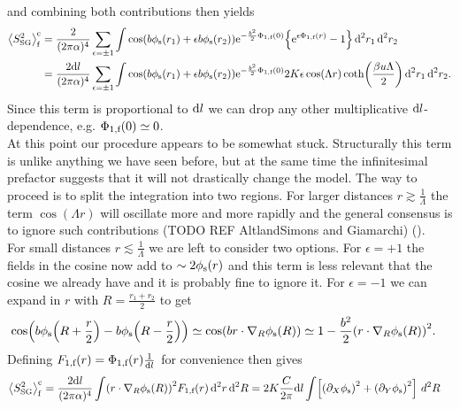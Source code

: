 \documentclass[english, parskip=full]{scrartcl}
\begin{document}
and combining both contributions then yields
\begin{align}
\bra*{S_\text{SG}^2}_\f^\c &= \frac{2}{(2\pi\alpha)^4} \sum_{\epsilon=\pm 1} \int \cos\kla*{b\phi_\s(r_1) + \epsilon b\phi_\s(r_2)} \powe{-\frac{b^2}{2} \Phi_{1,\f}(0) } \klc*{\powe{\epsilon \Phi_{1,\f}(r)} - 1} \,\d^2r_1\,\d^2r_2\\
&= \frac{2\d l}{(2\pi\alpha)^4} \sum_{\epsilon=\pm 1} \int \cos\kla*{b\phi_\s(r_1) + \epsilon b\phi_\s(r_2)} \powe{-\frac{b^2}{2} \Phi_{1,\f}(0) } 2K\epsilon\cos(\Lambda r) \coth\kla*{\frac{\beta u\Lambda}{2}} \,\d^2r_1\,\d^2r_2.
\end{align}
Since this term is proportional to $\text{d} l$ we can drop any other multiplicative $\text{d} l$-dependence, e.g. $\Phi_{1,\text{f}}(0) \simeq 0$.\\
At this point our procedure appears to be somewhat stuck.
Structurally this term is unlike anything we have seen before, but at the same time the infinitesimal prefactor suggests that it will not drastically change the model.
The way to proceed is to split the integration into two regions.
For larger distances $r \gtrsim \frac{1}{\Lambda}$ the term $\cos(\Lambda r) $ will oscillate more and more rapidly and the general consensus is to ignore such contributions (TODO REF AltlandSimons and Giamarchi) ().\\
For small distances $r\lesssim \frac{1}{\Lambda}$ we are left to consider two options.
For $\epsilon=+1$ the fields in the cosine now add to $\sim 2\phi_{\text{s}}(r)$ and this term is less relevant that the cosine we already have and it is probably fine to ignore it.
For $\epsilon=-1$ we can expand in $r$ with $R = \frac{r_1 + r_2}{2}$ to get
\begin{align}
\cos\kla*{b\phi_\s\kla*{R + \frac{r}{2}} - b\phi_\s\kla*{R - \frac{r}{2}}} &\simeq \cos\kla*{br\cdot \nabla_R \phi_\s(R)} \simeq 1 - \frac{b^2}{2} \kla*{r\cdot \nabla_R \phi_\s(R)}^2.
\end{align}
Defining $F_{1,\text{f}}(r) = \Phi_{1,\text{f}}(r) \frac{1}{\text{d} l}$ for convenience then gives
\begin{align}
\bra*{S_\text{SG}^2}_\f^\c &= \frac{2\d l}{(2\pi\alpha)^4} \int \kla*{r\cdot \nabla_R\phi_\s(R)}^2 F_{1,\f}(r) \,\d^2r\,\d^2R = 2K \frac{C}{2\pi} \d l \int \klb*{\kla*{\partial_X\phi_\s}^2 + \kla*{\partial_Y\phi_\s}^2} \,\,d^2R
\end{align}
\end{document}
